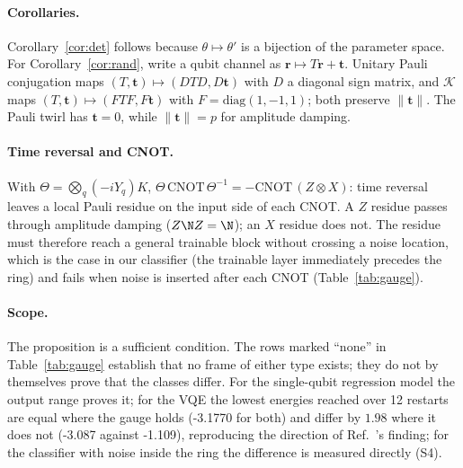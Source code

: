 \paragraph{Corollaries.}
Corollary~\ref{cor:det} follows because $\theta\mapsto\theta'$ is a bijection of the parameter
space. For Corollary~\ref{cor:rand}, write a qubit channel as $\mathbf r\mapsto T\mathbf r+\mathbf t$.
Unitary Pauli conjugation maps $(T,\mathbf t)\mapsto(D T D, D\mathbf t)$ with $D$ a diagonal
sign matrix, and $\mathcal K$ maps $(T,\mathbf t)\mapsto(FTF,F\mathbf t)$ with $F=\mathrm{diag}(1,-1,1)$;
both preserve $\lVert\mathbf t\rVert$. The Pauli twirl has $\mathbf t=0$, while
$\lVert\mathbf t\rVert=p$ for amplitude damping.

\paragraph{Time reversal and CNOT.}
With $\Theta=\bigotimes_q(-iY_q)K$, $\Theta\,\mathrm{CNOT}\,\Theta^{-1}=-\mathrm{CNOT}\,(Z\otimes X)$:
time reversal leaves a local Pauli residue on the input side of each CNOT. A $Z$ residue
passes through amplitude damping ($Z\N Z=\N$); an $X$ residue does not. The residue must
therefore reach a general trainable block without crossing a noise location, which is the
case in our classifier (the trainable layer immediately precedes the ring) and fails when
noise is inserted after each CNOT (Table~\ref{tab:gauge}).

\paragraph{Scope.}
The proposition is a sufficient condition. The rows marked ``none'' in
Table~\ref{tab:gauge} establish that no frame of either type exists; they do not by
themselves prove that the classes differ. For the single-qubit regression model the
output range proves it; for the VQE the lowest energies reached over 12 restarts are equal where the gauge holds (-3.1770 for both) and differ by $1.98$ where it does not (-3.087 against -1.109), reproducing the direction of Ref.~\cite{vanrossum2026biased}'s finding; for the
classifier with noise inside the ring the difference is measured directly (S4).
